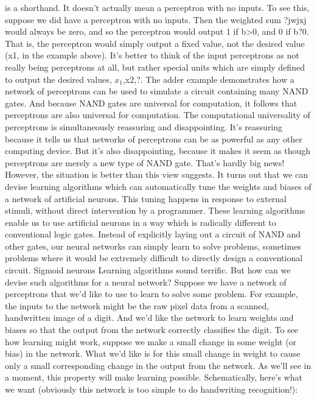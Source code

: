 is a shorthand. It doesn't actually mean a perceptron with no inputs. To see this, suppose we did have a perceptron with no inputs. Then the weighted sum ?jwjxj would always be zero, and so the perceptron would output 1 if b>0, and 0 if b?0. That is, the perceptron would simply output a fixed value, not the desired value (x1, in the example above). It's better to think of the input perceptrons as not really being perceptrons at all, but rather special units which are simply defined to output the desired values, $x_1$,x2,?.
The adder example demonstrates how a network of perceptrons can be used to simulate a circuit containing many NAND gates. And because NAND gates are universal for computation, it follows that perceptrons are also universal for computation.
The computational universality of perceptrons is simultaneously reassuring and disappointing. It's reassuring because it tells us that networks of perceptrons can be as powerful as any other computing device. But it's also disappointing, because it makes it seem as though perceptrons are merely a new type of NAND gate. That's hardly big news!
However, the situation is better than this view suggests. It turns out that we can devise learning algorithms which can automatically tune the weights and biases of a network of artificial neurons. This tuning happens in response to external stimuli, without direct intervention by a programmer. These learning algorithms enable us to use artificial neurons in a way which is radically different to conventional logic gates. Instead of explicitly laying out a circuit of NAND and other gates, our neural networks can simply learn to solve problems, sometimes problems where it would be extremely difficult to directly design a conventional circuit.
Sigmoid neurons
Learning algorithms sound terrific. But how can we devise such algorithms for a neural network? Suppose we have a network of perceptrons that we'd like to use to learn to solve some problem. For example, the inputs to the network might be the raw pixel data from a scanned, handwritten image of a digit. And we'd like the network to learn weights and biases so that the output from the network correctly classifies the digit. To see how learning might work, suppose we make a small change in some weight (or bias) in the network. What we'd like is for this small change in weight to cause only a small corresponding change in the output from the network. As we'll see in a moment, this property will make learning possible. Schematically, here's what we want (obviously this network is too simple to do handwriting recognition!):

